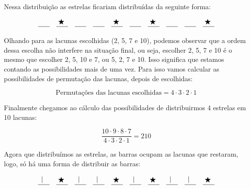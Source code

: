 \documentclass[12pt,a4paper]{report}
\begin{document}
\begin{destaque}
\vspace{0.5cm}
		
		Nessa distribuição as estrelas ficariam distribuídas da seguinte forma:
		
		$$\underline{\hspace{0.6cm}} \quad 
		\overset{\scalebox{1}{$\bigstar$}}{\underline{\hspace{0.6cm}}} \quad 
		\underline{\hspace{0.6cm}} \quad 
		\underline{\hspace{0.6cm}} \quad 
		\overset{\scalebox{1}{$\bigstar$}}{\underline{\hspace{0.6cm}}} \quad 
		\underline{\hspace{0.6cm}} \quad 
		\overset{\scalebox{1}{$\bigstar$}}{\underline{\hspace{0.6cm}}} \quad 
		\underline{\hspace{0.6cm}} \quad 
		\underline{\hspace{0.6cm}} \quad 
		\overset{\scalebox{1}{$\bigstar$}}{\underline{\hspace{0.6cm}}}$$
		
		
		Olhando para as lacunas escolhidas (2, 5, 7 e 10), podemos observar que a ordem dessa escolha não interfere na situação final, ou seja, escolher 2, 5, 7 e 10 é o mesmo que escolher 2, 5, 10 e 7, ou 5, 2, 7 e 10. Isso significa que estamos contando as possibilidades mais de uma vez. Para isso vamos calcular as possibilidades de permutação das lacunas, depois de escolhidas:
		
		$$ \text{Permutações das lacunas escolhidas} = 4 \cdot 3 \cdot 2 \cdot 1$$
		
		Finalmente chegamos ao cálculo das possibilidades de distribuirmos 4 estrelas em 10 lacunas:
		
		$$\frac{10 \cdot 9 \cdot 8 \cdot 7}{4 \cdot 3 \cdot 2 \cdot 1} = 210$$
		
		Agora que distribuímos as estrelas, as barras ocupam as lacunas que restaram, logo, só há uma forma de distribuir as barras:
		
		$$\overset{\scalebox{1}{$\mid$}}{\underline{\hspace{0.6cm}}} \quad 
		\overset{\scalebox{1}{$\bigstar$}}{\underline{\hspace{0.6cm}}} \quad 
		\overset{\scalebox{1}{$\mid$}}{\underline{\hspace{0.6cm}}} \quad 
		\overset{\scalebox{1}{$\mid$}}{\underline{\hspace{0.6cm}}} \quad 
		\overset{\scalebox{1}{$\bigstar$}}{\underline{\hspace{0.6cm}}} \quad 
		\overset{\scalebox{1}{$\mid$}}{\underline{\hspace{0.6cm}}} \quad 
		\overset{\scalebox{1}{$\bigstar$}}{\underline{\hspace{0.6cm}}} \quad 
		\overset{\scalebox{1}{$\mid$}}{\underline{\hspace{0.6cm}}} \quad 
		\overset{\scalebox{1}{$\mid$}}{\underline{\hspace{0.6cm}}} \quad 
		\overset{\scalebox{1}{$\bigstar$}}{\underline{\hspace{0.6cm}}}$$
		

\end{destaque}
\end{document}
